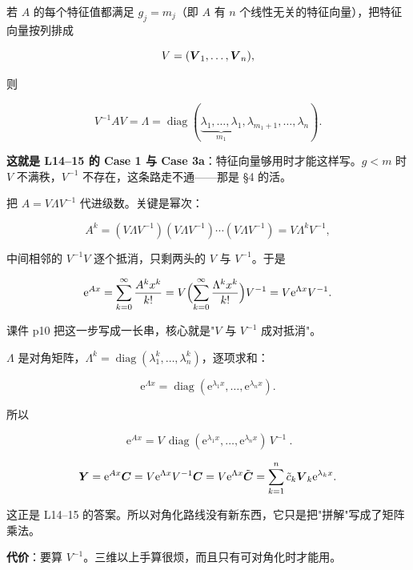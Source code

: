\documentclass[11pt]{ctexart}
\newcommand{\diag}{\operatorname{diag}}
\begin{document}

若 $A$ 的每个特征值都满足 $g_j=m_j$（即 $A$ 有 $n$ 个线性无关的特征向量），把特征向量按列排成

\[
V=(\boldsymbol{V}_1,\dots,\boldsymbol{V}_n),
\]

则

\[
V^{-1}AV=\Lambda=\diag(\underbrace{\lambda_1,\dots,\lambda_1}_{m_1},\lambda_{m_1+1},\dots,\lambda_n).
\]

\textbf{这就是 L14--15 的 Case 1 与 Case 3a}：特征向量够用时才能这样写。$g<m$ 时 $V$ 不满秩，$V^{-1}$ 不存在，这条路走不通——那是 §4 的活。


把 $A=V\Lambda V^{-1}$ 代进级数。关键是幂次：

\[
A^k=(V\Lambda V^{-1})(V\Lambda V^{-1})\cdots(V\Lambda V^{-1})=V\Lambda^kV^{-1},
\]

中间相邻的 $V^{-1}V$ 逐个抵消，只剩两头的 $V$ 与 $V^{-1}$。于是

\[
\mathrm{e}^{Ax}=\sum_{k=0}^{\infty}\frac{A^kx^k}{k!}
=V\Bigl(\sum_{k=0}^{\infty}\frac{\Lambda^kx^k}{k!}\Bigr)V^{-1}
=V\mathrm{e}^{\Lambda x}V^{-1}.
\]

课件 p10 把这一步写成一长串，核心就是"$V$ 与 $V^{-1}$ 成对抵消"。


$\Lambda$ 是对角矩阵，$\Lambda^k=\diag(\lambda_1^k,\dots,\lambda_n^k)$，逐项求和：

\[
\mathrm{e}^{\Lambda x}=\diag(\mathrm{e}^{\lambda_1x},\dots,\mathrm{e}^{\lambda_nx}).
\]

所以

\[
\boxed{\ \mathrm{e}^{Ax}=V\,\diag(\mathrm{e}^{\lambda_1x},\dots,\mathrm{e}^{\lambda_nx})\,V^{-1}\ }.
\]


\[
\boldsymbol{Y}=\mathrm{e}^{Ax}\boldsymbol{C}=V\mathrm{e}^{\Lambda x}V^{-1}\boldsymbol{C}
=V\mathrm{e}^{\Lambda x}\tilde{\boldsymbol{C}}
=\sum_{k=1}^{n}\tilde c_k\boldsymbol{V}_k\mathrm{e}^{\lambda_kx}.
\]

这正是 L14--15 的答案。所以对角化路线没有新东西，它只是把"拼解"写成了矩阵乘法。

\textbf{代价}：要算 $V^{-1}$。三维以上手算很烦，而且只有可对角化时才能用。


\end{document}
